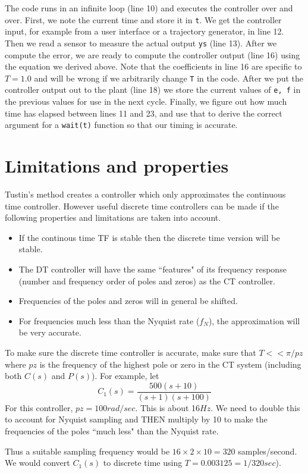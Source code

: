 
The code runs in an infinite loop (line 10) and executes the controller over and over.  First, we note the current time and store it in {\tt t}.  We get the controller input, for example from a user interface or a trajectory generator, in line 12.   Then we read a sensor to measure the actual output {\tt ys} (line 13).  After we compute the error, we are ready to compute the controller output (line 16) using the equation we derived above.  Note that the coefficients in line 16 are specific to $T=1.0$ and will be wrong if we arbitrarily change {\tt T} in the code.   After we put the controller output out to the plant (line 18) we store the current values of {\tt e, f} in the previous values for use in the next cycle.   Finally, we figure out how much time has elapsed between lines 11 and 23, and use that to derive the correct argument for a {\tt wait(t)} function so that our timing is accurate.

\section{Limitations and properties}\label{Limitations}
 Tustin's method creates a controller which only approximates the continuous time controller. However useful discrete time controllers can be made if the following properties and limitations are taken into account.	%

\begin{itemize}
  \item If the continous time TF is stable then the discrete time version will be stable.
  \item The DT controller will have the same ``features"  of its frequency response (number and frequency order of poles and zeros) as the CT controller.
  \item Frequencies of the poles and zeros will in general be shifted.
  \item For frequencies much less than the Nyquist rate ($f_N$), the approximation will be very accurate.
\end{itemize}


To make sure the discrete time controller is accurate, make sure that $T<<\pi/pz$ where $pz$ is the frequency of the highest pole or zero in the CT system (including both $C(s)$ and $P(s)$).   For example, let
\[
C_1(s) = \frac{500(s+10)}{(s+1)(s+100)}
\]
For this controller, $pz = 100rad/sec$.   This is about 16$Hz$.
We need to double this to account for Nyquist sampling and THEN multiply by 10 to make the frequencies of the poles ``much less" than the Nyquist rate.

Thus a suitable sampling frequency would be $16\times2\times10 = 320$ samples/second.  We would convert $C_1(s)$ to discrete time using $T=0.003125 = 1/320 sec$).




